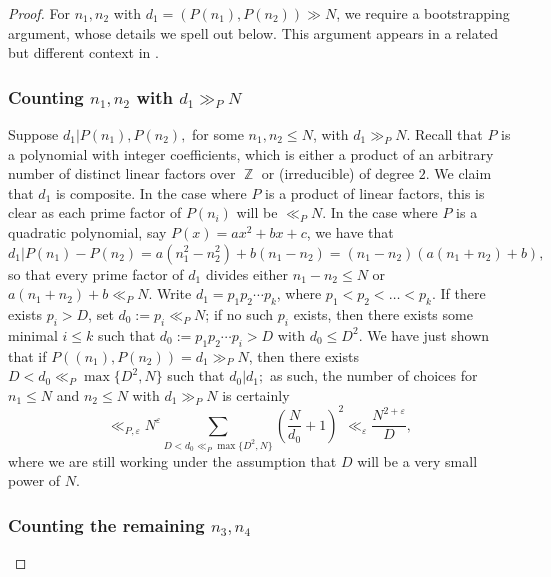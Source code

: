 \documentclass[11pts]{amsart}
\numberwithin{equation}{section}
\DeclareMathOperator{\Z}{\mathbb{Z}}
\begin{document}
\begin{proof}
For $n_1,n_2$ with $d_1=(P(n_1),P(n_2))\gg N$, we require a bootstrapping argument, whose details we spell out below. This argument appears in a related but different context in \cite[Theorem 1.8]{Granville-twists}.

\subsubsection{Counting $n_1,n_2$ with $d_1\gg_P N$}

Suppose $d_1|P(n_1),P(n_2),$ for some $n_1,n_2\leq N$, with $d_1\gg_P N$. Recall that $P$ is a polynomial with integer coefficients, which is either a product of an arbitrary number of distinct linear factors over $\Z$ or (irreducible) of degree $2$. We claim that $d_1$ is composite. In the case where $P$ is a product of linear factors, this is clear as each prime factor of $P(n_i)$ will be $\ll_P N$. In the case where $P$ is a quadratic polynomial, say $P(x)=ax^2+bx+c$, we have that $d_1 | P(n_1)-P(n_2) = a(n_1^2 - n_2^2) + b(n_1-n_2) = (n_1-n_2)(a(n_1+n_2)+b),$ so that every prime factor of $d_1$ divides either $n_1-n_2\leq N$ or $a(n_1+n_2)+b\ll_P N$. Write $d_1=p_1p_2\cdots p_k$, where $p_1<p_2<\dots<p_k$. If there exists $p_i>D$, set $d_0:=p_i\ll_P N$; if no such $p_i$ exists, then there exists some minimal $i\leq k$ such that $d_0:=p_1p_2\cdots p_i>D$ with $d_0\leq D^2$. We have just shown that if $P((n_1),P(n_2))=d_1\gg_P N$, then there exists $D<d_0\ll_P \max\{D^2,N\}$ such that $d_0|d_1;$ as such, the number of choices for $n_1\leq N$ and $n_2\leq N$ with $d_1\gg_P N$ is certainly
\begin{equation}
    \ll_{P,\varepsilon} 
    N^{\varepsilon}
    \sum_{D< d_0\ll_P \max\{D^2, N\}}
    \left(\frac{N}{d_0} + 1\right)^2 
    \ll_{\varepsilon} \frac{N^{2+ \varepsilon}}{D},
    \end{equation}
where we are still working under the assumption that $D$ will be a very small power of $N$.

\subsubsection{Counting the remaining $n_3,n_4$}


\end{proof}
\end{document}
